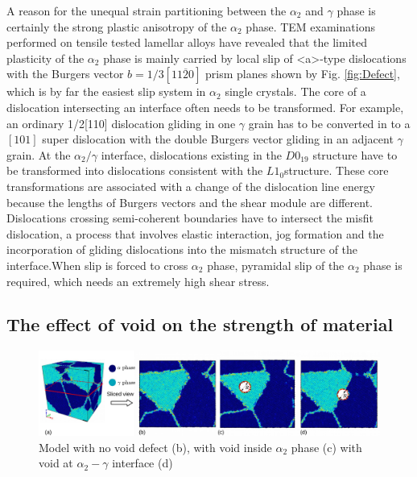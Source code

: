 \documentclass[metals,article,submit,moreauthors,pdftex,10pt,a4paper]{Definitions/mdpi}
\begin{document}
A reason for the unequal strain partitioning between the $\alpha_2$ and $\gamma$ phase is certainly the strong plastic anisotropy of the $\alpha_2$ phase. TEM examinations performed on tensile tested lamellar alloys have revealed that the limited plasticity of the $\alpha_2$ phase is mainly carried by local slip of <a>-type dislocations with the Burgers vector $b=1/3[11\overline{2}0]$ prism planes shown by Fig. \ref{fig:Defect}, which is by far the easiest slip system in $\alpha_2$ single crystals.  The core of a dislocation intersecting an interface often needs to be transformed. For example, an ordinary 1/2[110] dislocation gliding in one $\gamma$ grain has to be converted in to a $[101]$ super dislocation with the double Burgers vector gliding in an adjacent $\gamma$ grain. At the $\alpha_2/\gamma$ interface, dislocations existing in the $D0_{19}$ structure have to be transformed into dislocations consistent with the $L1_0$structure. These core transformations are associated with a change of the dislocation line energy because the lengths of Burgers vectors and the shear module are different. Dislocations crossing semi-coherent boundaries have to intersect the misfit dislocation, a process that involves elastic interaction, jog formation and the incorporation of gliding dislocations into the mismatch structure of the interface.When slip is forced to cross $\alpha_2$ phase, pyramidal slip of the $\alpha_2$ phase is required, which needs an extremely high shear stress.


\subsection{The effect of void on the strength of material}

\begin{figure}[ht]
	\centeringz
	\includegraphics[width=1\linewidth]{img/slice-view}
	\caption{ Model with no void defect (b), with void inside $\alpha_2$ phase (c) with void at $\alpha_2-\gamma$ interface (d)}
	\label{fig:model-creation}
\end{figure}
\end{document}
